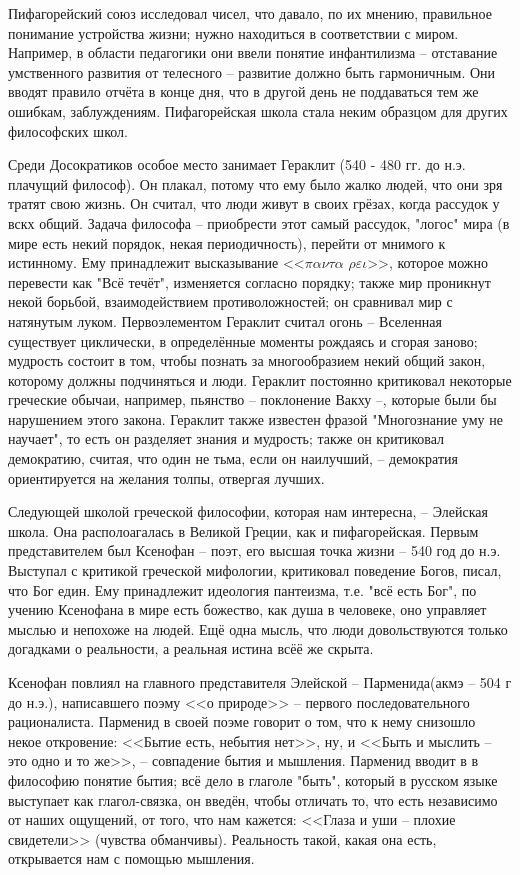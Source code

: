 \documentclass[a4paper, 12pt]{article} %
\begin{document}
Пифагорейский союз исследовал чисел, что давало, по их мнению, правильное понимание устройства жизни; нужно находиться в соответствии с миром. Например, в области педагогики они ввели понятие инфантилизма -- отставание умственного развития от телесного -- развитие должно быть гармоничным. Они вводят правило отчёта в конце дня, что в другой день не поддаваться тем же ошибкам, заблуждениям. Пифагорейская школа стала неким образцом для других философских школ.

Среди Досократиков особое место занимает Гераклит (540 - 480 гг. до н.э. плачущий философ). Он плакал, потому что ему было жалко людей, что они зря тратят свою жизнь. Он считал, что люди живут в своих грёзах, когда рассудок у вскх общий. Задача философа -- приобрести этот самый рассудок, "логос" мира (в мире есть некий порядок, некая периодичность), перейти от мнимого к истинному. Ему принадлежит высказывание <<$\pi \alpha \nu \tau \alpha$ $\rho \varepsilon \iota$>>, которое можно перевести как "Всё течёт", изменяется согласно порядку; также мир проникнут некой борьбой, взаимодействием противоложностей; он сравнивал мир с натянутым луком. Первоэлементом Гераклит считал огонь -- Вселенная существует циклически, в определённые моменты рождаясь и сгорая заново; мудрость состоит в том, чтобы познать за многообразием некий общий закон, которому должны подчиняться и люди. Гераклит постоянно критиковал некоторые греческие обычаи, например, пьянство -- поклонение Вакху --, которые были бы нарушением этого закона. Гераклит также известен фразой "Многознание уму не научает", то есть он разделяет знания и мудрость; также он критиковал демократию, считая, что один не тьма, если он наилучший, -- демократия ориентируется на желания толпы, отвергая лучших.
 
Следующей школой греческой философии, которая нам интересна, -- Элейская школа. Она располоагалась в Великой Греции, как и пифагорейская. Первым представителем был Ксенофан -- поэт, его высшая точка жизни -- 540 год до н.э. Выступал с критикой греческой мифологии, критиковал поведение Богов, писал, что Бог един. Ему принадлежит идеология пантеизма, т.е. "всё есть Бог", по учению Ксенофана в мире есть божество, как душа в человеке, оно управляет мыслью и непохоже на людей. Ещё одна мысль, что люди довольствуются только догадками о реальности, а реальная истина всёё же скрыта. 

Ксенофан повлиял на главного представителя Элейской -- Парменида(акмэ -- 504 г до н.э.), написавшего поэму <<о природе>> -- первого последовательного рационалиста. Парменид в своей поэме говорит о том, что к нему снизошло некое откровение: <<Бытие есть, небытия нет>>, ну, и <<Быть и мыслить -- это одно и то же>>, -- совпадение бытия и мышления. Парменид вводит в в философию понятие бытия; всё дело в глаголе "быть", который  в русском языке выступает как глагол-связка, он введён, чтобы отличать то, что есть независимо от наших ощущений, от того, что нам кажется: <<Глаза и уши -- плохие свидетели>> (чувства обманчивы). Реальность такой, какая она есть, открывается нам с помощью мышления. 
\end{document}
